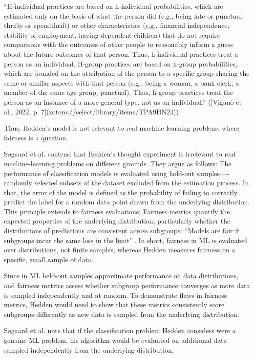 \documentclass{article}
\begin{document}
“H-individual practices are based on h-individual probabilities, which are estimated only on the basis of what the person did (e.g., being late or punctual, thrifty or spendthrift) or other characteristics (e.g., financial independence, stability of employment, having dependent children) that do not require comparisons with the outcomes of other people to reasonably inform a guess about the future outcomes of that person. Thus, h-individual practices treat a person as an individual. H-group practices are based on h-group probabilities, which are founded on the attribution of the person to a specific group sharing the same or similar aspects with that person (e.g., being a woman, a bank clerk, a member of the same age group, punctual). Thus, h-group practices treat the person as an instance of a more general type, not as an individual.” ([Viganò et al., 2022, p. 7](zotero://select/library/items/TPA9HN24))

Thus, Hedden's model is not relevant to real machine learning problems where fairness is a question. 

Søgaard et al. \citeyear{Sogaard_2024} contend that Hedden's thought experiment is irrelevant to real machine-learning problems on different grounds. They argue as follows: The performance of classification models is evaluated using hold-out samples—-randomly selected subsets of the dataset excluded from the estimation process. In that, the error of the model is defined as the probability of failing to correctly predict the label for a random data point drawn from the underlying distribution. This principle extends to fairness evaluations: Fairness metrics quantify the expected properties of the underlying distribution, particularly whether the distributions of predictions are consistent across subgroups: ``Models are fair if subgroups incur the same loss in the limit" \cite[p. 9]{Sogaard_2024}. In short, fairness in ML is evaluated over distributions, not finite samples, whereas Hedden measures fairness on a specific, small sample of data. 

Since in ML held-out samples approximate performance on data distributions, and fairness metrics assess whether subgroup performance converges as more data is sampled independently and at random. To demonstrate flaws in fairness metrics, Hedden would need to show that these metrics consistently score subgroups differently as new data is sampled from the underlying distribution. 

Søgaard et al. \citeyear{Sogaard_2024} note that if the classification problem Hedden considers were a genuine ML problem, his algorithm would be evaluated on additional data sampled independently from the underlying distribution.
\end{document}
